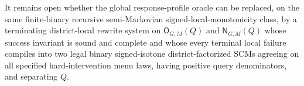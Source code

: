 It remains open whether the global response-profile oracle can be replaced, on the same finite-binary recursive semi-Markovian signed-local-monotonicity class, by a terminating district-local rewrite system on \(\mathsf O_{G,M}(Q)\) and \(\mathsf N_{G,M}(Q)\) whose success invariant is sound and complete and whose every terminal local failure compiles into two legal binary signed-isotone district-factorized SCMs agreeing on all specified hard-intervention menu laws, having positive query denominators, and separating \(Q\).